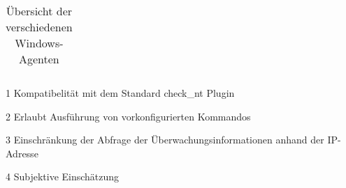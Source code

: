 \begin{table}[!cht]
\begin{threeparttable}
\begin{tabular}{l p{1.3cm} l p{1.3cm} l p{1.3cm} l p{1.3cm} l p{1.3cm} l p{1.3cm} p{1.3cm} p{1.3cm} p{1.3cm} p{1.3cm}}
\end{tabular}
\begin{tablenotes}\footnotesize
		\item[1] Kompatibelität mit dem Standard check\_nt Plugin
		\item[2] Erlaubt Ausführung von vorkonfigurierten Kommandos
        \item[3] Einschränkung der Abfrage der Überwachungsinformationen anhand der \gls{IP}-Adresse
        \item[4] Subjektive Einschätzung
    \end{tablenotes}
\caption{Übersicht der verschiedenen Windows-Agenten}
\label{tab:winagents}
\end{threeparttable}
\end{table}
